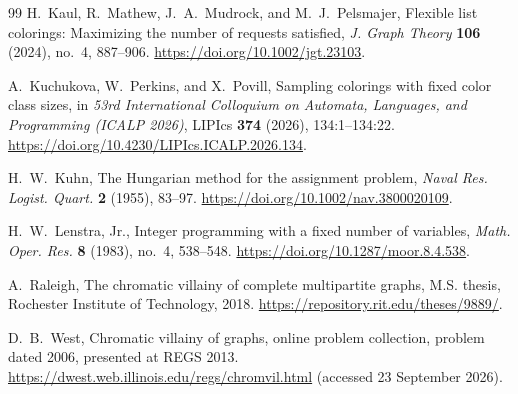 \documentclass[10pt,a4paper]{amsart}
\numberwithin{equation}{section}
\theoremstyle{definition}
\theoremstyle{remark}
\begin{document}
\begin{thebibliography}{99}
H.~Kaul, R.~Mathew, J.~A.~Mudrock, and M.~J.~Pelsmajer,
Flexible list colorings: Maximizing the number of requests satisfied,
\emph{J. Graph Theory} \textbf{106} (2024), no.~4, 887--906.
\url{https://doi.org/10.1002/jgt.23103}.

A.~Kuchukova, W.~Perkins, and X.~Povill,
Sampling colorings with fixed color class sizes,
in \emph{53rd International Colloquium on Automata, Languages, and Programming
(ICALP 2026)}, LIPIcs \textbf{374} (2026), 134:1--134:22.
\url{https://doi.org/10.4230/LIPIcs.ICALP.2026.134}.

H.~W.~Kuhn,
The Hungarian method for the assignment problem,
\emph{Naval Res. Logist. Quart.} \textbf{2} (1955), 83--97.
\url{https://doi.org/10.1002/nav.3800020109}.

H.~W.~Lenstra, Jr.,
Integer programming with a fixed number of variables,
\emph{Math. Oper. Res.} \textbf{8} (1983), no.~4, 538--548.
\url{https://doi.org/10.1287/moor.8.4.538}.

A.~Raleigh,
The chromatic villainy of complete multipartite graphs,
M.S. thesis, Rochester Institute of Technology, 2018.
\url{https://repository.rit.edu/theses/9889/}.

D.~B.~West,
Chromatic villainy of graphs,
online problem collection, problem dated 2006, presented at REGS 2013.
\url{https://dwest.web.illinois.edu/regs/chromvil.html}
(accessed 23 September 2026).

\end{thebibliography}
\end{document}
